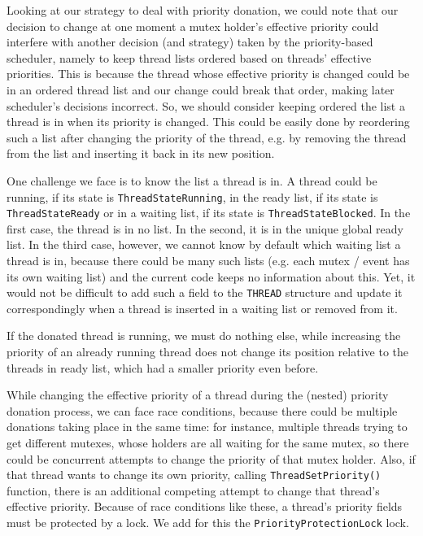 Looking at our strategy to deal with priority donation, we could note that our decision to change at one moment a mutex holder's effective priority could interfere with another decision (and strategy) taken by the priority-based scheduler, namely to keep thread lists ordered based on threads' effective priorities. This is because the thread whose effective priority is changed could be in an ordered thread list and our change could break that order, making later scheduler's decisions incorrect. So, we should consider keeping ordered the list a thread is in when its priority is changed. This could be easily done by reordering such a list after changing the priority of the thread, e.g. by removing the thread from the list and inserting it back in its new position. 

One challenge we face is to know the list a thread is in. A thread could be running, if its state is \lstinline|ThreadStateRunning|, in the ready list, if its state is \lstinline|ThreadStateReady| or in a waiting list, if its state is \lstinline|ThreadStateBlocked|. In the first case, the thread is in no list. In the second, it is in the unique global ready list. In the third case, however, we cannot know by default which waiting list a thread is in, because there could be many such lists (e.g. each mutex / event has its own waiting list) and the current code keeps no information about this. Yet, it would not be difficult to add such a field to the \lstinline|THREAD| structure and update it correspondingly when a thread is inserted in a waiting list or removed from it. 

If the donated thread is running, we must do nothing else, while increasing the priority of an already running thread does not change its position relative to the threads in ready list, which had a smaller priority even before. 

While changing the effective priority of a thread during the (nested) priority donation process, we can face race conditions, because there could be multiple donations taking place in the same time: for instance, multiple threads trying to get different mutexes, whose holders are all waiting for the same mutex, so there could be concurrent attempts to change the priority of that mutex holder. Also, if that thread wants to change its own priority, calling \lstinline|ThreadSetPriority()| function, there is an additional competing attempt to change that thread's effective priority. Because of race conditions like these, a thread's priority fields must be protected by a lock. We add for this the \lstinline|PriorityProtectionLock| lock.


